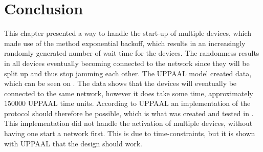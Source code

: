 \section{Conclusion}
This chapter presented a way to handle the start-up of multiple devices, which made use of the method exponential backoff, which results in an increasingly randomly generated number of wait time for the devices. 
The randomness results in all devices eventually becoming connected to the network since they will be split up and thus stop jamming each other.
The UPPAAL model created data, which can be seen on .
The data shows that the devices will eventually be connected to the same network, however it does take some time, approximately $150 000$ UPPAAL time units.
According to UPPAAL an implementation of the protocol should therefore be possible, which is what was created and tested in .
This implementation did not handle the activation of multiple devices, without having one start a network first. 
This is due to time-constraints, but it is shown with UPPAAL that the design should work.
